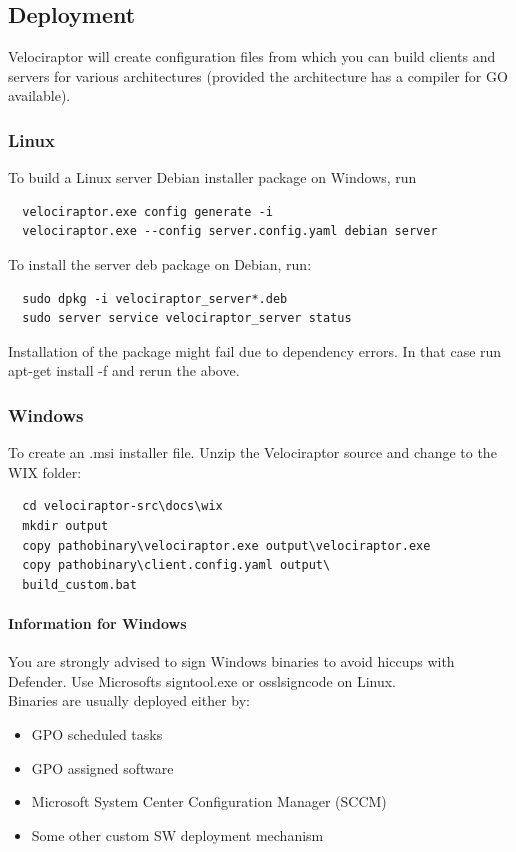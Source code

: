 \subsection{Deployment}
Velociraptor will create configuration files from which you can build clients and servers for various architectures (provided the architecture has a compiler for GO available).\\

\subsubsection{Linux}
To build a Linux server Debian installer package on Windows, run
\begin{lstlisting}
  velociraptor.exe config generate -i
  velociraptor.exe --config server.config.yaml debian server
\end{lstlisting}
To install the server deb package on Debian, run:
\begin{lstlisting}
  sudo dpkg -i velociraptor_server*.deb
  sudo server service velociraptor_server status
\end{lstlisting}
Installation of the package might fail due to dependency errors. In that case run apt-get install -f and rerun the above.

\subsubsection{Windows}
To create an .msi installer file. Unzip the Velociraptor source and change to the WIX folder:
\begin{lstlisting}
  cd velociraptor-src\docs\wix
  mkdir output
  copy pathobinary\velociraptor.exe output\velociraptor.exe
  copy pathobinary\client.config.yaml output\
  build_custom.bat
\end{lstlisting}

\paragraph{Information for Windows}
You are strongly advised to sign Windows binaries to avoid hiccups with Defender. Use Microsofts signtool.exe or osslsigncode on Linux.\\

Binaries are usually deployed either by:
\begin{itemize}
  \item GPO scheduled tasks
  \item GPO assigned software
  \item Microsoft System Center Configuration Manager (SCCM)
  \item Some other custom SW deployment mechanism
\end{itemize}

